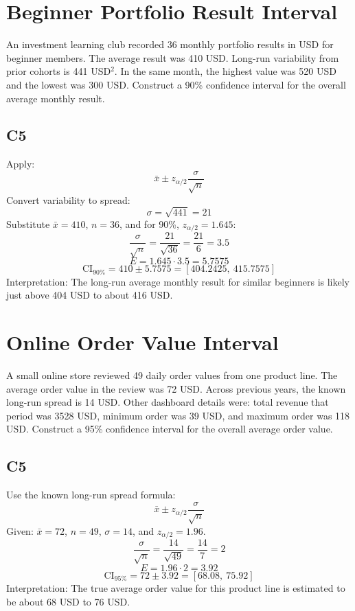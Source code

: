 \begin{ExamProblems}
		\newpage
		\item
		\section{Beginner Portfolio Result Interval}
		An investment learning club recorded 36 monthly portfolio results in USD for beginner members.
		The average result was 410 USD.
		Long-run variability from prior cohorts is 441 USD$^2$.
		In the same month, the highest value was 520 USD and the lowest was 300 USD.
		Construct a 90\% confidence interval for the overall average monthly result.

		\subsection*{C5}
		Apply:
		\[
		\bar{x} \pm z_{\alpha/2}\frac{\sigma}{\sqrt{n}}
		\]
		Convert variability to spread:
		\[
		\sigma=\sqrt{441}=21
		\]
		Substitute $\bar{x}=410$, $n=36$, and for 90\%, $z_{\alpha/2}=1.645$:
		\[
		\frac{\sigma}{\sqrt{n}}=\frac{21}{\sqrt{36}}=\frac{21}{6}=3.5
		\]
		\[
		E=1.645\cdot 3.5=5.7575
		\]
		\[
		\text{CI}_{90\%}=410\pm 5.7575=[404.2425,\ 415.7575]
		\]
		Interpretation: The long-run average monthly result for similar beginners is likely just above 404 USD to about 416 USD.

		\newpage
		\item
		\section{Online Order Value Interval}
		A small online store reviewed 49 daily order values from one product line.
		The average order value in the review was 72 USD.
		Across previous years, the known long-run spread is 14 USD.
		Other dashboard details were: total revenue that period was 3528 USD, minimum order was 39 USD, and maximum order was 118 USD.
		Construct a 95\% confidence interval for the overall average order value.

		\subsection*{C5}
		Use the known long-run spread formula:
		\[
		\bar{x} \pm z_{\alpha/2}\frac{\sigma}{\sqrt{n}}
		\]
		Given: $\bar{x}=72$, $n=49$, $\sigma=14$, and $z_{\alpha/2}=1.96$.
		\[
		\frac{\sigma}{\sqrt{n}}=\frac{14}{\sqrt{49}}=\frac{14}{7}=2
		\]
		\[
		E=1.96\cdot 2=3.92
		\]
		\[
		\text{CI}_{95\%}=72\pm 3.92=[68.08,\ 75.92]
		\]
		Interpretation: The true average order value for this product line is estimated to be about 68 USD to 76 USD.


\end{ExamProblems}
